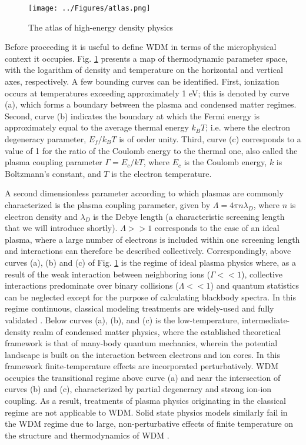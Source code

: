 \documentclass [11pt, proquest, article] {uwthesis}[2016/11/22]
\begin{document}
\begin{figure}[h] 
\caption{The atlas of high-energy density physics\cite{plasma2003frontiers}}
\label{fig:atlas}
\centering
\texttt{[image: ../Figures/atlas.png]}
\end{figure}

Before proceeding it is useful to define WDM in terms of the microphysical context it occupies. Fig. \ref{fig:atlas} presents a map of thermodynamic parameter space, with the logarithm of density and temperature on the horizontal and vertical axes, respectively. A few bounding curves can be identified. First, ionization occurs at temperatures exceeding approximately 1 eV; this is denoted by curve (a), which forms a boundary between the plasma and condensed matter regimes. Second, curve (b) indicates the boundary at which the Fermi energy is approximately equal to the average thermal energy $k_BT$; i.e. where the electron degeneracy parameter, $E_f/k_B T$ is of order unity. Third, curve (c) corresponds to a value of 1 for the ratio of the Coulomb energy to the thermal one, also called the plasma coupling parameter  $\Gamma = E_c/kT$, where $E_c$ is the Coulomb energy, $k$ is Boltzmann's constant, and $T$ is the electron temperature. 

A second dimensionless parameter according to which plasmas are commonly characterized is the plasma coupling parameter, given by $\Lambda = 4 \pi n \lambda_D$, where $n$ is electron density and $\lambda_D$ is the Debye length (a characteristic screening length that we will introduce shortly). $\Lambda >> 1$ corresponds to the case of an ideal plasma, where a large number of electrons is included within one screening length and interactions can therefore be described collectively. Correspondingly, above curves (a), (b) and (c) of Fig. \ref{fig:atlas} is the regime of ideal plasma physics where, as a result of the weak interaction between neighboring ions ($\Gamma << 1$), collective interactions predominate over binary collisions ($\Lambda << 1$) and quantum statistics can be neglected  except for the purpose of calculating blackbody spectra. In this regime continuous, classical modeling treatments are widely-used and fully validated \cite{krall1973principles}. Below curves (a), (b), and (c) is the low-temperature, intermediate-density realm of condensed matter physics, where the established theoretical framework is that of many-body quantum mechanics, wherein the potential landscape is built on the interaction between electrons and ion cores. In this framework finite-temperature effects are incorporated perturbatively. WDM occupies the transitional regime above curve (a) and near the intersection of curves (b) and (c), characterized by partial degeneracy and strong ion-ion coupling. As a result, treatments of plasma physics originating in the classical regime are not applicable to WDM. Solid state physics models similarly fail in the WDM regime due to large, non-perturbative effects of finite temperature on the structure and thermodynamics of WDM \cite{mattern2013condensed}.  
\end{document}
